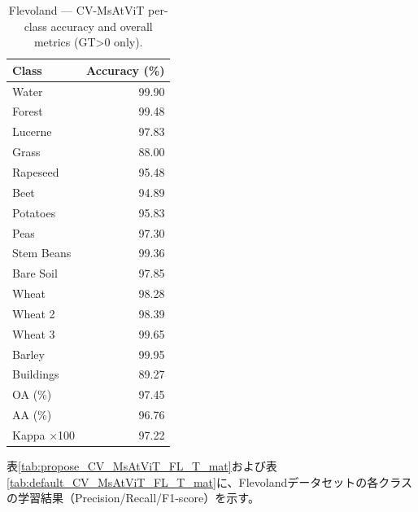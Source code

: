 \begin{table}[H]
  \centering
  \caption{Flevoland — CV-MsAtViT per-class accuracy and overall metrics (GT>0 only).}
  \label{tab:flevoland_cvm}
  \begin{tabular}{l r}
    \toprule
    Class & Accuracy (\%) \\
    \midrule
    Water & 99.90 \\
    Forest & 99.48 \\
    Lucerne & 97.83 \\
    Grass & 88.00 \\
    Rapeseed & 95.48 \\
    Beet & 94.89 \\
    Potatoes & 95.83 \\
    Peas & 97.30 \\
    Stem Beans & 99.36 \\
    Bare Soil & 97.85 \\
    Wheat & 98.28 \\
    Wheat 2 & 98.39 \\
    Wheat 3 & 99.65 \\
    Barley & 99.95 \\
    Buildings & 89.27 \\
    \midrule
    OA (\%) & 97.45 \\
    AA (\%) & 96.76 \\
    Kappa $\times$100 & 97.22 \\
    \bottomrule
  \end{tabular}
\end{table}

表\ref{tab:propose_CV_MsAtViT_FL_T_mat}および表\ref{tab:default_CV_MsAtViT_FL_T_mat}に、Flevolandデータセットの各クラスの学習結果（Precision/Recall/F1-score）を示す。

